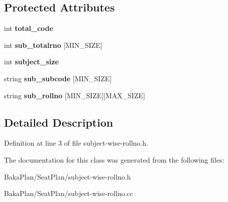 \subsection*{Protected Attributes}
\begin{DoxyCompactItemize}
\item 
\hypertarget{classSubjectWiseRollNo_aa719b1f10268b6cc741132aced93a321}{int {\bfseries total\-\_\-code}}\label{classSubjectWiseRollNo_aa719b1f10268b6cc741132aced93a321}

\item 
\hypertarget{classSubjectWiseRollNo_a9700a22dff37ac2fd095cbcc3f3e2874}{int {\bfseries sub\-\_\-totalrno} \mbox{[}M\-I\-N\-\_\-\-S\-I\-Z\-E\mbox{]}}\label{classSubjectWiseRollNo_a9700a22dff37ac2fd095cbcc3f3e2874}

\item 
\hypertarget{classSubjectWiseRollNo_a9eef1e17ae0aace37af78b15395ee3e5}{int {\bfseries subject\-\_\-size}}\label{classSubjectWiseRollNo_a9eef1e17ae0aace37af78b15395ee3e5}

\item 
\hypertarget{classSubjectWiseRollNo_a3e21660fe01181bf4595c4fe2163c528}{string {\bfseries sub\-\_\-subcode} \mbox{[}M\-I\-N\-\_\-\-S\-I\-Z\-E\mbox{]}}\label{classSubjectWiseRollNo_a3e21660fe01181bf4595c4fe2163c528}

\item 
\hypertarget{classSubjectWiseRollNo_a20ba02f66c6a634c1f4daeb0bd27b481}{string {\bfseries sub\-\_\-rollno} \mbox{[}M\-I\-N\-\_\-\-S\-I\-Z\-E\mbox{]}\mbox{[}M\-A\-X\-\_\-\-S\-I\-Z\-E\mbox{]}}\label{classSubjectWiseRollNo_a20ba02f66c6a634c1f4daeb0bd27b481}

\end{DoxyCompactItemize}


\subsection{Detailed Description}


Definition at line 3 of file subject-\/wise-\/rollno.\-h.



The documentation for this class was generated from the following files\-:\begin{DoxyCompactItemize}
\item 
Baka\-Plan/\-Seat\-Plan/subject-\/wise-\/rollno.\-h\item 
Baka\-Plan/\-Seat\-Plan/subject-\/wise-\/rollno.\-cc\end{DoxyCompactItemize}

